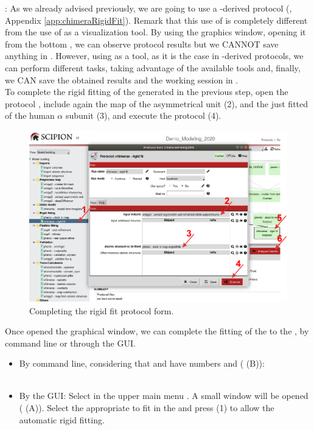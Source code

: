  : As we already advised previously, we are going to use a \chimera-derived protocol (, Appendix \ref{app:chimeraRigidFit}). Remark that this use of \chimera is completely different from the use of \chimera as a visualization tool. By using the \chimera graphics window, opening it from the \scipion bottom , we can observe protocol results but we CANNOT save anything in \scipion. However, using \chimera as a tool, as it is the case in \scipion \chimera-derived protocols, we can perform different tasks, taking advantage of the available \chimera tools and, finally, we CAN save the obtained results and the working session in \scipion.\\  
 
 To complete the rigid fitting of the  generated in the previous step, open the protocol , include again the map of the asymmetrical unit (2), and the just fitted  of the human  $\alpha$ subunit (3), and execute the protocol (4).
 
 \begin{figure}[H]
  \centering 
  \captionsetup{width=.9\linewidth} 
  \includegraphics[width=1\textwidth]{Images/Fig21}
  \caption{Completing the \chimera rigid fit protocol form.}
  \label{fig:chimera_rigid_fit}
  \end{figure}
  
  Once opened the \chimera graphical window, we can complete the fitting of the  to the , by \chimera command line or through the \chimera GUI. 
    \begin{itemize}
     \item By \chimera command line, considering that  and  have  numbers  and  ( (B)):\\
            \\
    \item By the \chimera GUI: Select in the upper main menu . A small window will be opened ( (A)). Select the appropriate  to fit in the  and press  (1) to allow the automatic rigid fitting.
    \end{itemize}

